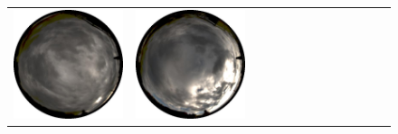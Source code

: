 \begin{figure}
\begin{tabular}{@{}rcccccccccccc@{}}
    \includegraphics[width=\customwidth]{./figures/database/20131106_155906.jpg} &
    \includegraphics[width=\customwidth]{./figures/database/20131106_163057.jpg}
    \\

\end{tabular}
\end{figure}
